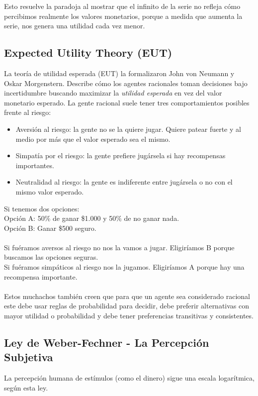 \documentclass{article}
\begin{document}
            Esto resuelve la paradoja al mostrar que el infinito de la serie no refleja cómo percibimos realmente los valores monetarios, porque a medida que aumenta la serie, nos genera una utilidad cada vez menor.
        \subsection*{Expected Utility Theory (EUT)}
            La teoría de utilidad esperada (EUT) la formalizaron John von Neumann y Oskar Morgenstern. Describe cómo los agentes racionales toman decisiones bajo incertidumbre buscando maximizar la \emph{utilidad esperada} en vez del valor monetario esperado. La gente racional suele tener tres comportamientos posibles frente al riesgo:
            \begin{itemize}
                \item Aversión al riesgo: la gente no se la quiere jugar. Quiere patear fuerte y al medio por más que el valor esperado sea el mismo.
                \item Simpatía por el riesgo: la gente prefiere jugársela si hay recompensas importantes.
                \item Neutralidad al riesgo: la gente es indiferente entre jugársela o no con el mismo valor esperado.
            \end{itemize}
            Si tenemos dos opciones: \\
            Opción A: 50\% de ganar \$1.000 y 50\% de no ganar nada. \\
            Opción B: Ganar \$500 seguro.\\
            \\
            Si fuéramos aversos al riesgo no nos la vamos a jugar. Eligiríamos B porque buscamos las opciones seguras. \\
            Si fuéramos simpáticos al riesgo nos la jugamos. Eligiríamos A porque hay una recompensa importante. \\
            \\
            Estos muchachos también creen que para que un agente sea considerado racional este debe usar reglas de probabilidad para decidir, debe preferir alternativas con mayor utilidad o probabilidad y debe tener preferencias transitivas y consistentes.
        \subsection*{Ley de Weber-Fechner - La Percepción Subjetiva}
            La percepción humana de estímulos (como el dinero) sigue una escala logarítmica, según esta ley.
\end{document}
